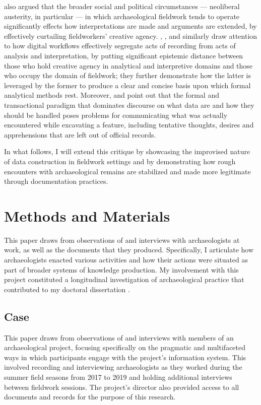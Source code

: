 \documentclass{article}
\begin{document}
\textcite{thorpe2012} also argued that the broader social and political
circumstances --- neoliberal austerity, in particular --- in which
archaeological fieldwork tends to operate significantly effects how
interpretations are made and arguments are extended, by effectively
curtailing fieldworkers' creative agency. \textcite{huggett2022},
\textcite{caraher2019}, \textcite{batist2021} and
\textcite{batist-alienation} similarly draw attention to how digital
workflows effectively segregate acts of recording from acts of analysis
and interpretation, by putting significant epistemic distance between
those who hold creative agency in analytical and interpretive domains
and those who occupy the domain of fieldwork; they further demonstrate
how the latter is leveraged by the former to produce a clear and concise
basis upon which formal analytical methods rest. Moreover,
\textcite{batist2024a} and \textcite{haciguzeller2021} point out that
the formal and transactional paradigm that dominates discourse on what
data are and how they should be handled poses problems for communicating
what was actually encountered while excavating a feature, including
tentative thoughts, desires and apprehensions that are left out of
official records.

In what follows, I will extend this critique by showcasing the
improvised nature of data construction in fieldwork settings and by
demonstrating how rough encounters with archaeological remains are
stabilized and made more legitimate through documentation practices.



\section{Methods and Materials}
This paper draws from observations of and interviews with archaeologists
at work, as well as the documents that they produced. Specifically, I
articulate how archaeologists enacted various activities and how their
actions were situated as part of broader systems of knowledge
production. My involvement with this project constituted a longitudinal
investigation of archaeological practice that contributed to my doctoral
dissertation \parencite[see][]{batist2023a}.

\subsection{Case}

This paper draws from observations of and interviews with members of an
archaeological project, focusing specifically on the pragmatic and
multifaceted ways in which participants engage with the project's
information system. This involved recording and interviewing
archaeologists as they worked during the summer field seasons from 2017
to 2019 and holding additional interviews between fieldwork sessions.
The project's director also provided access to all documents and records
for the purpose of this research.
\end{document}
